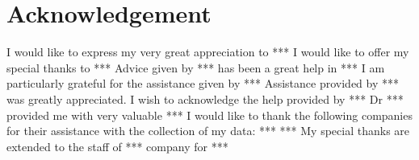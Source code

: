 \chapter*{Acknowledgement}

I would like to express my very great appreciation to ***
I would like to offer my special thanks to ***
Advice given by *** has been a great help in ***
I am particularly grateful for the assistance given by ***
Assistance provided by *** was greatly appreciated.
I wish to acknowledge the help provided by ***
Dr *** provided me with very valuable ***
I would like to thank the following companies for their assistance with the collection of my data:
***
***
My special thanks are extended to the staff of *** company for ***